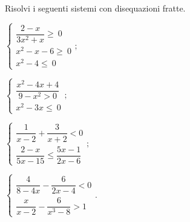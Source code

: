 \begin{esercizio}[\Ast]
\label{ese:18.73}
Risolvi i seguenti sistemi con disequazioni fratte.
\begin{multicols}{2}
\begin{enumeratea}{\longarray
 \item $\left\{\begin{array}{l}
		\dfrac{2-x}{3x^{2}+x}\ge~0\\
		x^{2}-x-6\ge~0\\
		x^{2}-4\le~0
	\end{array}\right.;$
\item $\left\{\begin{array}{l}
        \dfrac{x^{2}-4x+4}{9-x^{2}>0}\\
        x^{2}-3x\le~0
       \end{array}\right.;$
\item $\left\{\begin{array}{l}
	   \dfrac{1}{x-2}+\dfrac{3}{x+2}<0\\
	   \dfrac{2-x}{5x-15}\le\dfrac{5x-1}{2x-6}
	   \end{array}\right.;$
\item $\left\{\begin{array}{l}
	   \dfrac{4}{8-4x}-\dfrac{6}{2x-4}<0\\
	   \dfrac{x}{x-2}-\dfrac{6}{x^{3}-8}>1
	   \end{array}\right..$}
\end{enumeratea}
\end{multicols}
\end{esercizio}

